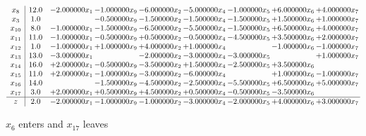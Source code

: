 \documentclass[10pt]{article}
\begin{document}
 \[\begin{array}{c| c c@{\hskip 2pt} c@{\hskip 2pt} c@{\hskip 2pt} c@{\hskip 2pt} c@{\hskip 2pt} c@{\hskip 2pt} c@{\hskip 2pt} }
 x_{8}   &  12.0 & -2.000000 x_{1} & -1.000000 x_{9} & -6.000000 x_{2} & -5.000000 x_{4} & -1.000000 x_{5} & + 6.000000 x_{6} & + 4.000000 x_{7}\\
 x_{3}   &  1.0  &   & -0.500000 x_{9} & -1.500000 x_{2} & -1.500000 x_{4} & -1.500000 x_{5} & + 1.500000 x_{6} & + 1.000000 x_{7}\\
 x_{10}   &  8.0 & -1.000000 x_{1} & -1.500000 x_{9} & -6.500000 x_{2} & -5.500000 x_{4} & -1.500000 x_{5} & + 6.500000 x_{6} & + 4.000000 x_{7}\\
 x_{11}   &  11.0 & -1.000000 x_{1} & -0.500000 x_{9} & + 0.500000 x_{2} & -0.500000 x_{4} & -4.500000 x_{5} & + 3.500000 x_{6} & + 2.000000 x_{7}\\
 x_{12}   &  1.0 & -1.000000 x_{1} & + 1.000000 x_{9} & + 4.000000 x_{2} & + 1.000000 x_{4} &   & -1.000000 x_{6} & -1.000000 x_{7}\\
 x_{13}   &  13.0 & -3.000000 x_{1} &   & -2.000000 x_{2} & -3.000000 x_{4} & -3.000000 x_{5} &   & + 1.000000 x_{7}\\
 x_{14}   &  16.0 & + 2.000000 x_{1} & -0.500000 x_{9} & -3.500000 x_{2} & + 1.500000 x_{4} & -2.500000 x_{5} & + 3.500000 x_{6} &   \\
 x_{15}   &  11.0 & + 2.000000 x_{1} & -1.000000 x_{9} & -3.000000 x_{2} & -6.000000 x_{4} &   & + 1.000000 x_{6} & -1.000000 x_{7}\\
 x_{16}   &  14.0  &   & -1.500000 x_{9} & -4.500000 x_{2} & -2.500000 x_{4} & -5.500000 x_{5} & + 6.500000 x_{6} & + 5.000000 x_{7}\\
 x_{17}   &  3.0 & + 2.000000 x_{1} & + 0.500000 x_{9} & + 4.500000 x_{2} & + 0.500000 x_{4} & -0.500000 x_{5} & -3.500000 x_{6} &   \\
\hline
z    &  2.0 & -2.000000 x_{1} & -1.000000 x_{9} & -1.000000 x_{2} & -3.000000 x_{4} & -2.000000 x_{5} & + 4.000000 x_{6} & + 3.000000 x_{7}\\
\end{array}\]


 $ x_{6} $ enters and $ x_{17} $ leaves 
\end{document}
